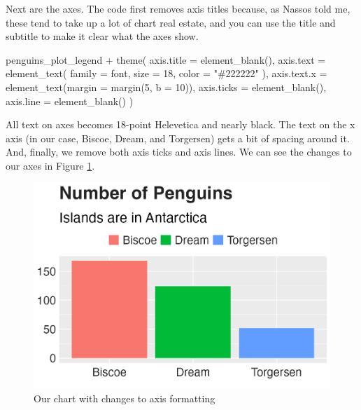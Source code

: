 \documentclass[
]{book}
\newenvironment{Shaded}{\begin{snugshade}}{\end{snugshade}}
\newcommand{\AttributeTok}[1]{\textcolor[rgb]{0.77,0.63,0.00}{#1}}
\newcommand{\DecValTok}[1]{\textcolor[rgb]{0.00,0.00,0.81}{#1}}
\newcommand{\FunctionTok}[1]{\textcolor[rgb]{0.00,0.00,0.00}{#1}}
\newcommand{\NormalTok}[1]{#1}
\newcommand{\SpecialCharTok}[1]{\textcolor[rgb]{0.00,0.00,0.00}{#1}}
\newcommand{\StringTok}[1]{\textcolor[rgb]{0.31,0.60,0.02}{#1}}
\begin{document}
Next are the axes. The code first removes axis titles because, as Nassos told me, these tend to take up a lot of chart real estate, and you can use the title and subtitle to make it clear what the axes show.

\begin{Shaded}
\begin{Highlighting}[]
\NormalTok{penguins\_plot\_legend }\SpecialCharTok{+}
  \FunctionTok{theme}\NormalTok{(}
    \AttributeTok{axis.title =} \FunctionTok{element\_blank}\NormalTok{(),}
    \AttributeTok{axis.text =} \FunctionTok{element\_text}\NormalTok{(}
      \AttributeTok{family =}\NormalTok{ font,}
      \AttributeTok{size =} \DecValTok{18}\NormalTok{,}
      \AttributeTok{color =} \StringTok{"\#222222"}
\NormalTok{    ),}
    \AttributeTok{axis.text.x =} \FunctionTok{element\_text}\NormalTok{(}\AttributeTok{margin =} \FunctionTok{margin}\NormalTok{(}\DecValTok{5}\NormalTok{, }\AttributeTok{b =} \DecValTok{10}\NormalTok{)),}
    \AttributeTok{axis.ticks =} \FunctionTok{element\_blank}\NormalTok{(),}
    \AttributeTok{axis.line =} \FunctionTok{element\_blank}\NormalTok{()}
\NormalTok{  )}
\end{Highlighting}
\end{Shaded}

All text on axes becomes 18-point Helevetica and nearly black. The text on the x axis (in our case, Biscoe, Dream, and Torgersen) gets a bit of spacing around it. And, finally, we remove both axis ticks and axis lines. We can see the changes to our axes in Figure \ref{fig:penguins-plot-axes-plot}.

\begin{figure}
\includegraphics[width=1\linewidth]{custom-theme_files/figure-latex/penguins-plot-axes-plot-1} \caption{Our chart with changes to axis formatting}\label{fig:penguins-plot-axes-plot}
\end{figure}
\end{document}
